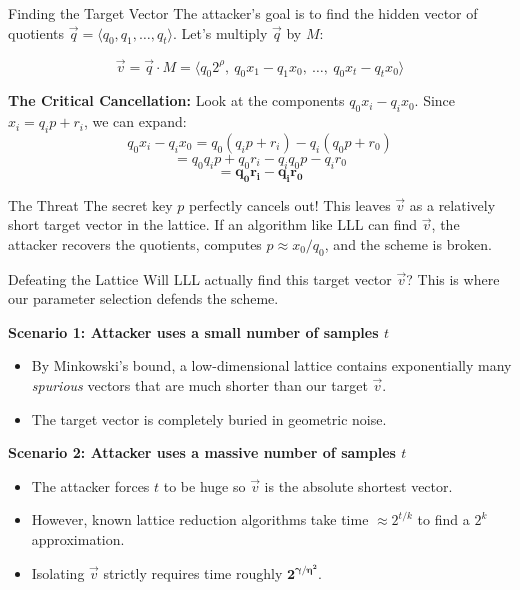 \documentclass[10pt]{beamer}
\begin{document}
\begin{frame}{Finding the Target Vector}
    The attacker's goal is to find the hidden vector of quotients $\vec{q} = \langle q_0, q_1, \dots, q_t \rangle$. Let's multiply $\vec{q}$ by $M$:
    
    $$ \vec{v} = \vec{q} \cdot M = \langle q_0 2^\rho, \ q_0 x_1 - q_1 x_0, \ \dots, \ q_0 x_t - q_t x_0 \rangle $$
    \pause
    
    \vspace{0.3cm}
    \textbf{The Critical Cancellation:} 
    Look at the components $q_0 x_i - q_i x_0$. Since $x_i = q_i p + r_i$, we can expand:
    $$ q_0 x_i - q_i x_0 = q_0(q_i p + r_i) - q_i(q_0 p + r_0) $$
    $$ = q_0 q_i p + q_0 r_i - q_i q_0 p - q_i r_0 $$
    $$ = \mathbf{q_0 r_i - q_i r_0} $$
    \pause
    
    \begin{block}{The Threat}
    The secret key $p$ perfectly cancels out! This leaves $\vec{v}$ as a relatively short target vector in the lattice. If an algorithm like LLL can find $\vec{v}$, the attacker recovers the quotients, computes $p \approx x_0 / q_0$, and the scheme is broken.
    \end{block}
\end{frame}

\begin{frame}{Defeating the Lattice}
    Will LLL actually find this target vector $\vec{v}$? This is where our parameter selection defends the scheme.
    \pause
    
    \vspace{0.3cm}
    \textbf{Scenario 1: Attacker uses a small number of samples $t$}
    \begin{itemize}
        \item By Minkowski's bound, a low-dimensional lattice contains exponentially many \textit{spurious} vectors that are much shorter than our target $\vec{v}$. 
        \item The target vector is completely buried in geometric noise.
    \end{itemize}
    \pause
    
    \vspace{0.3cm}
    \textbf{Scenario 2: Attacker uses a massive number of samples $t$}
    \begin{itemize}
        \item The attacker forces $t$ to be huge so $\vec{v}$ is the absolute shortest vector.
        \item However, known lattice reduction algorithms take time $\approx 2^{t/k}$ to find a $2^k$ approximation.
        \item Isolating $\vec{v}$ strictly requires time roughly $\mathbf{2^{\gamma / \eta^2}}$.
    \end{itemize}
\end{frame}
\end{document}
